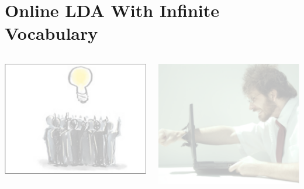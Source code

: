 \documentclass[compress]{beamer}
\begin{document}
\section{Online LDA With Infinite Vocabulary}

\begin{frame}
  \vspace{-2cm}
  \begin{columns}
    \begin{center}
      \includegraphics[width=\linewidth]{cognitive/crowdsourcing_off}
      \end{center}
    \begin{center}
      \includegraphics[width=\linewidth]{cognitive/user_off}
      \end{center}


\end{columns}
\end{frame}
\end{document}
